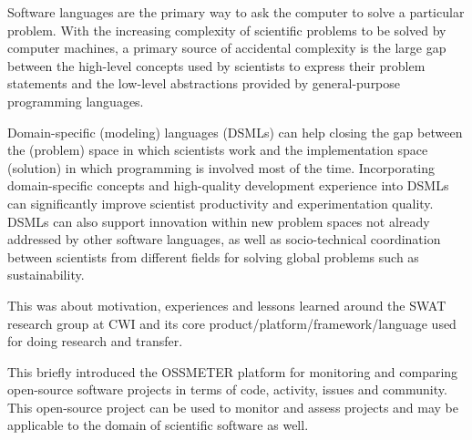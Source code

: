 \documentclass[a4paper,UKenglish]{dagrep}
\begin{document}

Software languages are the primary way to ask the computer to solve a particular problem. With the increasing complexity of scientific problems to be solved by computer machines, a primary source of accidental complexity is the large gap between the high-level concepts used by scientists to express their problem statements and the low-level abstractions provided by general-purpose programming languages. 

Domain-specific (modeling) languages (DSMLs) can help closing the gap between the (problem) space in which scientists work and the implementation space (solution) in which programming is involved most of the time. Incorporating domain-specific concepts and high-quality development experience into DSMLs can significantly improve scientist productivity and experimentation quality. DSMLs can also support innovation within new problem spaces not already addressed by other software languages, as well as socio-technical coordination between scientists from different fields for solving global problems such as sustainability. 

\abstracttitle{}


This was about motivation, experiences and lessons learned around the SWAT research group at CWI and its core product/platform/framework/language used for doing research and transfer. 


This briefly introduced the OSSMETER platform for monitoring and comparing open-source software projects in terms of code, activity, issues and community. This open-source project can be used to monitor and assess projects and may be applicable to the domain of scientific software as well.

\abstractauthor[]{}
 
\end{document}
